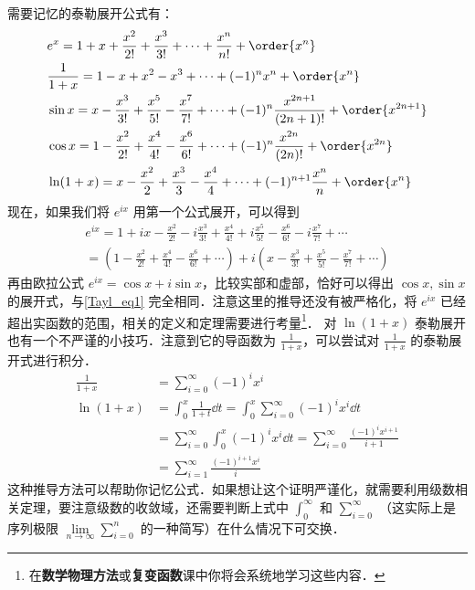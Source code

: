 需要记忆的泰勒展开公式有：
\begin{equation}\label{Tayl_eq1}
\begin{aligned}
&e^x=1+x+\frac{x^2}{2!}+\frac{x^3}{3!}+\cdots+\frac{x^n}{n!}+\order{x^n}\\
&\frac{1}{1+x}=1-x+x^2-x^3+\cdots+(-1)^nx^n+\order{x^n}\\
&\sin x=x-\frac{x^3}{3!}+\frac{x^5}{5!}-\frac{x^7}{7!}+\cdots+(-1)^n\frac{x^{2n+1}}{(2n+1)!}+\order{x^{2n+1}}\\
&\cos x=1-\frac{x^2}{2!}+\frac{x^4}{4!}-\frac{x^6}{6!}+\cdots+(-1)^n\frac{x^{2n}}{(2n)!}+\order{x^{2n}}\\
&\ln (1+x)=x-\frac{x^2}{2}+\frac{x^3}{3}-\frac{x^4}{4}+\cdots+(-1)^{n+1}\frac{x^n}{n}+\order{x^n}\\
\end{aligned}
\end{equation}
现在，如果我们将 $e^{ix}$ 用第一个公式展开，可以得到
\begin{equation}
\begin{aligned}
e^{ix}=1+ix-\frac{x^2}{2!}-i\frac{x^3}{3!}+\frac{x^4}{4!}+i\frac{x^5}{5!}-\frac{x^6}{6!}-i\frac{x^7}{7!}+\cdots\\
=(1-\frac{x^2}{2!}+\frac{x^4}{4!}-\frac{x^6}{6!}+\cdots)+i(x-\frac{x^3}{3!}+\frac{x^5}{5!}-\frac{x^7}{7!}+\cdots)
\end{aligned}
\end{equation}
再由欧拉公式 $e^{ix}=\cos x+i\sin x$，比较实部和虚部，恰好可以得出 $\cos x,\sin x$ 的展开式，与\autoref{Tayl_eq1} 完全相同．注意这里的推导还没有被严格化，将 $e^{ix}$ 已经超出实函数的范围，相关的定义和定理需要进行考量\footnote{在\textbf{数学物理方法}或\textbf{复变函数}课中你将会系统地学习这些内容．}．
对 $\ln(1+x)$ 泰勒展开也有一个不严谨的小技巧．注意到它的导函数为 $\frac{1}{1+x}$，可以尝试对 $\frac{1}{1+x}$ 的泰勒展开式进行积分．
\begin{equation}
\begin{aligned}
\frac{1}{1+x}&=\sum_{i=0}^{\infty} (-1)^i x^i\\
\ln(1+x)&=\int_0^x \frac{1}{1+t}\dd t = \int_0^x \sum_{i=0}^{\infty} (-1)^i x^i\dd t \\
&= \sum_{i=0}^{\infty} \int_0^x(-1)^i x^i\dd t = \sum_{i=0}^{\infty} \frac{(-1)^i x^{i+1}}{i+1}\\
&= \sum_{i=1}^{\infty} \frac{(-1)^{i+1} x^{i}}{i}
\end{aligned}
\end{equation}
这种推导方法可以帮助你记忆公式．如果想让这个证明严谨化，就需要利用级数相关定理，要注意级数的收敛域，还需要判断上式中 $\int_0^{\infty}$ 和 $\sum_{i=0}^{\infty}$ （这实际上是序列极限 $\lim\limits_{n\rightarrow \infty} \sum_{i=0}^{n}$ 的一种简写）在什么情况下可交换．
